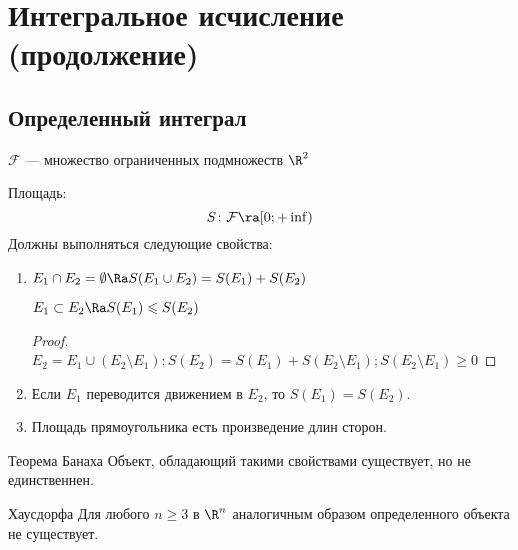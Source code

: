 \chapter{Интегральное исчисление (продолжение)}
\section{Определенный интеграл}

\begin{Def}
	$\mathcal{F}$ --- множество ограниченных подмножеств $\R^2$
\end{Def}

\begin{Def}
	Площадь:
	\[ S\colon \mathcal{F} \ra [0; +\inf) \]
	Должны выполняться следующие свойства:

	\begin{enumerate}
	\item 
		$E_1 \cap E_2 = \emptyset \Ra S(E_1 \cup E_2) = S(E_1) + S(E_2)$
		\begin{conseq*}
			$E_1 \subset E_2 \Ra S(E_1) \leqslant S(E_2)$
		\end{conseq*}
		\begin{proof}
			$E_2 = E_1 \cup (E_2 \setminus E_1); S(E_2) = S(E_1) + S(E_2 \setminus E_1); S(E_2 \setminus E_1) \geqslant 0$
		\end{proof}
	
	\item 
		Если $E_1$ переводится движением в $E_2$, то $S(E_1) = S(E_2)$.

	\item 
		Площадь прямоугольника есть произведение длин сторон.
	\end{enumerate} 
\end{Def}

\begin{theorem}{Теорема Банаха}
	Объект, обладающий такими свойствами существует, но не единственнен.
\end{theorem}

\begin{theorem}{Хаусдорфа}
	Для любого $n \ge 3$ в $\R^n$ аналогичным образом определенного объекта не существует.
\end{theorem}


